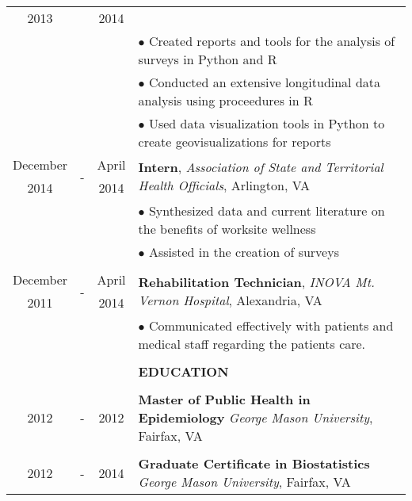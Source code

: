 \documentclass[11pt]{article}
\begin{document}
\begin{table}[ht]
\begin{tabular}{@{\hspace{0mm}}c@{\hspace{1mm}}c@{\hspace{3mm}}cl}
            2013 & & 2014 &\\
            & & & $\bullet$ Created reports and tools for the analysis of surveys in Python and R\\
            & & & $\bullet$ Conducted an extensive longitudinal data analysis using proceedures in R\\
            & & & $\bullet$ Used data visualization tools in Python to create geovisualizations for reports\\
            December & \multirow{2}{*}{-} & April & \multirow{2}{*}{\textbf{Intern}, \textit{Association of State and Territorial Health Officials}, Arlington, VA}\\
            2014 & & 2014 &\\
            & & & $\bullet$ Synthesized data and current literature on the benefits of worksite wellness\\
            & & & $\bullet$ Assisted in the creation of surveys\\
            \\
            December & \multirow{2}{*}{-} & April & \multirow{2}{*}{\textbf{Rehabilitation Technician}, \textit{INOVA Mt. Vernon Hospital}, Alexandria, VA}\\
            2011 & & 2014 &\\
            & & & $\bullet$ Communicated effectively with patients and medical staff regarding the patients care.\\
            & & & \color{maroon}{\rule{12cm}{1.0pt}}\\
            & & & \large{\textbf{EDUCATION}}\\
            & & & \color{maroon}{\rule{12cm}{1.0pt}}\\
            2012 & - & 2012 & \textbf{Master of Public Health in Epidemiology} \textit{George Mason University}, Fairfax, VA\\
            \\
            2012 & - & 2014 & \textbf{Graduate Certificate in Biostatistics} \textit{George Mason University}, Fairfax, VA\\

\end{tabular}
\end{table}
\end{document}
